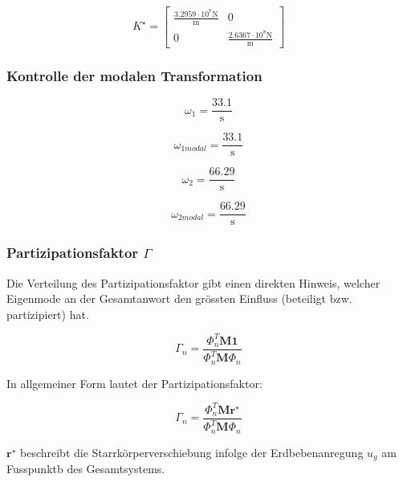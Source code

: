 \documentclass[
  letterpaper,
  DIV=11]{scrreprt}
\begin{document}
\begin{equation*}K^{\star} = \left[\begin{matrix}\frac{3.2959 \cdot 10^{7} \text{N}}{\text{m}} & 0\\0 & \frac{2.6367 \cdot 10^{8} \text{N}}{\text{m}}\end{matrix}\right]\end{equation*}

\hypertarget{kontrolle-der-modalen-transformation-1}{%
\subsubsection{Kontrolle der modalen
Transformation}\label{kontrolle-der-modalen-transformation-1}}

\begin{equation*}\omega_{1} = \frac{33.1}{\text{s}}\end{equation*}

\begin{equation*}\omega_{1 modal} = \frac{33.1}{\text{s}}\end{equation*}

\begin{equation*}\omega_{2} = \frac{66.29}{\text{s}}\end{equation*}

\begin{equation*}\omega_{2 modal} = \frac{66.29}{\text{s}}\end{equation*}

\hypertarget{partizipationsfaktor-gamma}{%
\subsubsection{\texorpdfstring{Partizipationsfaktor
\(\Gamma\)}{Partizipationsfaktor \textbackslash Gamma}}\label{partizipationsfaktor-gamma}}

Die Verteilung des Partizipationsfaktor gibt einen direkten Hinweis,
welcher Eigenmode an der Gesamtanwort den grössten Einfluss (beteiligt
bzw. partizipiert) hat.

\[\Gamma_n = \frac{\Phi_n^T \mathbf{M 1}}{\Phi_n^T \mathbf{M}\Phi_n}\]

In allgemeiner Form lautet der Partizipationsfaktor:

\[\Gamma_n = \frac{\Phi_n^T \mathbf{M r^\star}}{\Phi_n^T \mathbf{M}\Phi_n}\]

\(\mathbf{r^\star}\) beschreibt die Starrkörperverschiebung infolge der
Erdbebenanregung \(u_g\) am Fusspunktb des Gesamtsystems.
\end{document}
